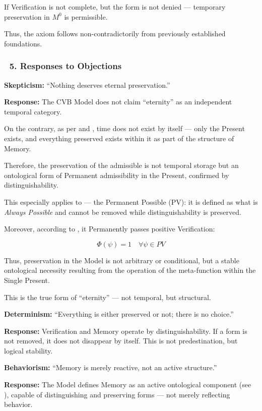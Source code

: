\documentclass[12pt]{article}
\begin{document}
If Verification is not complete, but the form is not denied — temporary preservation in $M^0$ is permissible.

Thus, the axiom follows non-contradictorily from previously established foundations.

\subsubsection*{🔹 5. Responses to Objections}

\textbf{Skepticism:}
``Nothing deserves eternal preservation.''

\textbf{Response:}
The CVB Model does not claim ``eternity'' as an independent temporal category.

On the contrary, as per \text{[10.3.7]} and \text{[10.3.8]}, time does not exist by itself — only the Present exists, and everything preserved exists within it as part of the structure of Memory.

Therefore, the preservation of the admissible is not temporal storage but an ontological form of Permanent admissibility in the Present, confirmed by distinguishability.

This especially applies to \text{[4.4]} — the Permanent Possible (PV): it is defined as what is \textit{Always Possible} and cannot be removed while distinguishability is preserved.

Moreover, according to \text{[11.1.1]}, it Permanently passes positive Verification:

\[
\Phi(\psi) = 1 \quad \forall \psi \in PV
\]

Thus, preservation in the Model is not arbitrary or conditional, but a stable ontological necessity resulting from the operation of the meta-function within the Single Present.

This is the true form of ``eternity'' — not temporal, but structural.

\bigskip

\textbf{Determinism:}
``Everything is either preserved or not; there is no choice.''

\textbf{Response:}
Verification and Memory operate by distinguishability. If a form is not removed, it does not disappear by itself. This is not predestination, but logical stability.

\bigskip

\textbf{Behaviorism:}
``Memory is merely reactive, not an active structure.''

\textbf{Response:}
The Model defines Memory as an active ontological component (see \text{[10.3]}), capable of distinguishing and preserving forms — not merely reflecting behavior.
\end{document}
